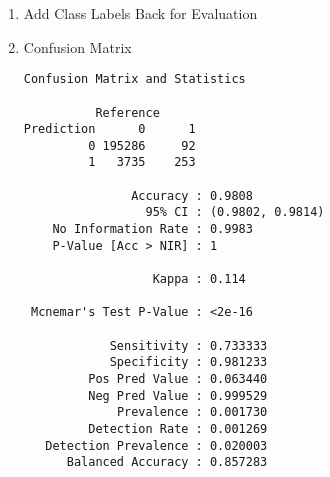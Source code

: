 \documentclass[
  11pt,
  letterpaper,
  DIV=11,
  numbers=noendperiod]{scrartcl}
\newenvironment{Shaded}{}{}
\newcommand{\AttributeTok}[1]{\textcolor[rgb]{0.84,0.23,0.29}{#1}}
\newcommand{\CommentTok}[1]{\textcolor[rgb]{0.42,0.45,0.49}{#1}}
\newcommand{\DecValTok}[1]{\textcolor[rgb]{0.00,0.36,0.77}{#1}}
\newcommand{\FloatTok}[1]{\textcolor[rgb]{0.00,0.36,0.77}{#1}}
\newcommand{\FunctionTok}[1]{\textcolor[rgb]{0.44,0.26,0.76}{#1}}
\newcommand{\NormalTok}[1]{\textcolor[rgb]{0.14,0.16,0.18}{#1}}
\newcommand{\OtherTok}[1]{\textcolor[rgb]{0.44,0.26,0.76}{#1}}
\newcommand{\SpecialCharTok}[1]{\textcolor[rgb]{0.00,0.36,0.77}{#1}}
\newcommand{\StringTok}[1]{\textcolor[rgb]{0.01,0.18,0.38}{#1}}
\begin{document}
\begin{enumerate}
\def\labelenumi{\arabic{enumi}.}
\setcounter{enumi}{3}
\item
  Add Class Labels Back for Evaluation

\begin{Shaded}
\end{Shaded}
\item
  Confusion Matrix

\begin{Shaded}
\end{Shaded}

\begin{verbatim}
Confusion Matrix and Statistics

          Reference
Prediction      0      1
         0 195286     92
         1   3735    253

               Accuracy : 0.9808          
                 95% CI : (0.9802, 0.9814)
    No Information Rate : 0.9983          
    P-Value [Acc > NIR] : 1               

                  Kappa : 0.114           

 Mcnemar's Test P-Value : <2e-16          

            Sensitivity : 0.733333        
            Specificity : 0.981233        
         Pos Pred Value : 0.063440        
         Neg Pred Value : 0.999529        
             Prevalence : 0.001730        
         Detection Rate : 0.001269        
   Detection Prevalence : 0.020003        
      Balanced Accuracy : 0.857283        


\end{verbatim}
\end{enumerate}
\end{document}
